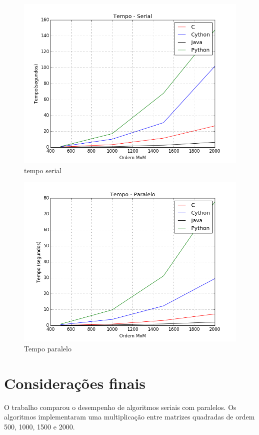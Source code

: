 \documentclass[a4paper,12pt]{article}
\begin{document}
\begin{figure}[!htb]
  \centering
  \includegraphics[width=15.0cm]{pictures/tempo_serial.png}
  \caption{tempo serial}
\label{fig:tempo_serial}
\end{figure}

\begin{figure}[!htb]
  \centering
  \includegraphics[width=15.0cm]{pictures/tempo_paralelo.png}
  \caption{Tempo paralelo}
\label{fig:tempo_paralelo}
\end{figure}



\section{Considerações finais}
O trabalho comparou o desempenho de algoritmos seriais com paralelos. Os algoritmos implementaram uma multiplicação entre matrizes quadradas de ordem 500, 1000, 1500 e 2000. 
\end{document}
